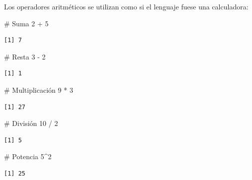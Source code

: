 \documentclass[
  spanish,
  letterpaper,
  DIV=11,
  numbers=noendperiod]{scrreprt}
\newenvironment{Shaded}{\begin{snugshade}}{\end{snugshade}}
\newcommand{\CommentTok}[1]{\textcolor[rgb]{0.37,0.37,0.37}{#1}}
\newcommand{\DecValTok}[1]{\textcolor[rgb]{0.68,0.00,0.00}{#1}}
\newcommand{\SpecialCharTok}[1]{\textcolor[rgb]{0.37,0.37,0.37}{#1}}
\begin{document}
Los operadores aritméticos se utilizan como si el lenguaje fuese una
calculadora:

\begin{Shaded}
\begin{Highlighting}[]
\CommentTok{\# Suma}
\DecValTok{2} \SpecialCharTok{+} \DecValTok{5}
\end{Highlighting}
\end{Shaded}

\begin{verbatim}
[1] 7
\end{verbatim}

\begin{Shaded}
\begin{Highlighting}[]
\CommentTok{\# Resta}
\DecValTok{3} \SpecialCharTok{{-}} \DecValTok{2}
\end{Highlighting}
\end{Shaded}

\begin{verbatim}
[1] 1
\end{verbatim}

\begin{Shaded}
\begin{Highlighting}[]
\CommentTok{\# Multiplicación}
\DecValTok{9} \SpecialCharTok{*} \DecValTok{3}
\end{Highlighting}
\end{Shaded}

\begin{verbatim}
[1] 27
\end{verbatim}

\begin{Shaded}
\begin{Highlighting}[]
\CommentTok{\# División}
\DecValTok{10} \SpecialCharTok{/} \DecValTok{2}
\end{Highlighting}
\end{Shaded}

\begin{verbatim}
[1] 5
\end{verbatim}

\begin{Shaded}
\begin{Highlighting}[]
\CommentTok{\# Potencia}
\DecValTok{5}\SpecialCharTok{\^{}}\DecValTok{2}
\end{Highlighting}
\end{Shaded}

\begin{verbatim}
[1] 25
\end{verbatim}
\end{document}
